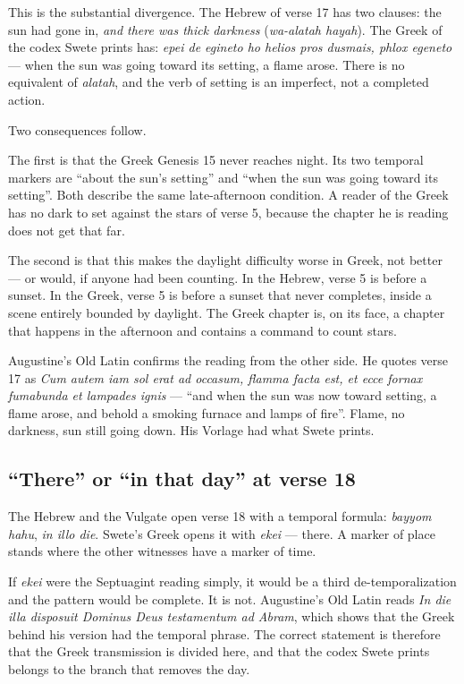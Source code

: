 This is the substantial divergence. The Hebrew of verse 17 has two clauses: the
sun had gone in, \emph{and there was thick darkness} (\textit{wa-alatah hayah}).
The Greek of the codex Swete prints has: \textit{epei de egineto ho helios pros
dusmais, phlox egeneto} --- when the sun was going toward its setting, a flame
arose. There is no equivalent of \textit{alatah}, and the verb of setting is an
imperfect, not a completed action.

Two consequences follow.

The first is that the Greek Genesis 15 never reaches night. Its two temporal
markers are ``about the sun's setting'' and ``when the sun was going toward its
setting''. Both describe the same late-afternoon condition. A reader of the
Greek has no dark to set against the stars of verse 5, because the chapter he is
reading does not get that far.

The second is that this makes the daylight difficulty worse in Greek, not
better --- or would, if anyone had been counting. In the Hebrew, verse 5 is
before a sunset. In the Greek, verse 5 is before a sunset that never completes,
inside a scene entirely bounded by daylight. The Greek chapter is, on its face,
a chapter that happens in the afternoon and contains a command to count stars.

Augustine's Old Latin confirms the reading from the other side. He quotes verse
17 as \textit{Cum autem iam sol erat ad occasum, flamma facta est, et ecce
fornax fumabunda et lampades ignis} --- ``and when the sun was now toward
setting, a flame arose, and behold a smoking furnace and lamps of fire''. Flame,
no darkness, sun still going down. His Vorlage had what Swete prints.

\subsection{``There'' or ``in that day'' at verse 18}

The Hebrew and the Vulgate open verse 18 with a temporal formula: \textit{bayyom
hahu}, \textit{in illo die}. Swete's Greek opens it with \textit{ekei} ---
there. A marker of place stands where the other witnesses have a marker of time.

If \textit{ekei} were the Septuagint reading simply, it would be a third
de-temporalization and the pattern would be complete. It is not. Augustine's Old
Latin reads \textit{In die illa disposuit Dominus Deus testamentum ad Abram},
which shows that the Greek behind his version had the temporal phrase. The
correct statement is therefore that the Greek transmission is divided here, and
that the codex Swete prints belongs to the branch that removes the day.

